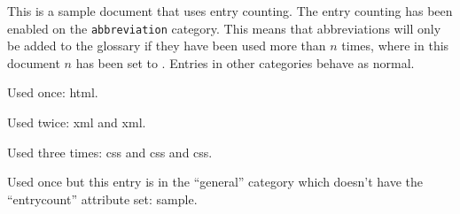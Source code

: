 \documentclass{article}
\begin{document}
This is a sample document that uses entry counting. The entry counting
has been enabled on the \texttt{abbreviation} category.
This means that abbreviations will only be added to the glossary 
if they have been used more than $n$ times, where in this 
document $n$ has been set to
.
Entries in other categories behave as normal.


Used once: \gls{html}.

Used twice: \gls{xml} and \gls{xml}.

Used three times: \gls{css} and \gls{css} and \gls{css}.

Used once but this entry is in the ``general'' category
which doesn't have the ``entrycount'' attribute set:
\gls{sample}.

\printglossaries
\end{document}
